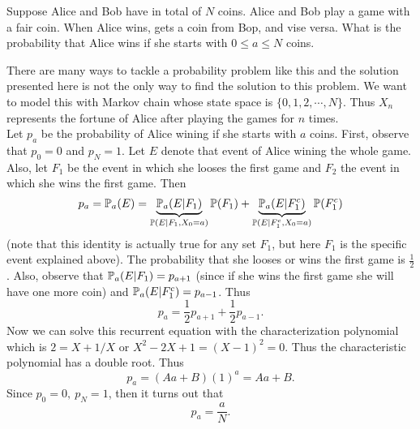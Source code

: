 \begin{example}
	Suppose Alice and Bob have in total of $N$ coins. Alice and Bob play a game with a fair coin. When Alice wins, gets a coin from Bop, and vise versa. What is the probability that Alice wins if she starts with $0\leq a \leq N$ coins.
	
	\begin{solution}
		There are many ways to tackle a probability problem like this and the solution presented here is not the only way to find the solution to this problem. We want to model this with Markov chain whose state space is $\{0,1,2,\cdots,N\}$. Thus $X_n$ represents the fortune of Alice after playing the games for $n$ times. 
		 \\
		Let $p_a$ be the probability of Alice wining if she starts with $a$ coins. First, observe that $p_0 = 0$ and $p_N= 1$. Let $E$ denote that event of Alice wining the whole game. Also, let $F_1$ be the event in which she looses the first game and $F_2$ the event in which she wins the first game. Then
		\[ p_a = \mathbb{P}_a(E) =  \underbrace{\mathbb{P}_a(E | F_1)}_{\mathbb{P}(E|F_1,X_0=a)} \mathbb{P}(F_1) + \underbrace{\mathbb{P}_a(E|F_1^c)}_{\mathbb{P}(E|F_1^c,X_0=a)}\mathbb{P}(F_1^c) \]
		(note that this identity is actually true for any set $F_1$, but here $F_1$ is the specific event explained above). The probability that she looses or wins the first game is $\frac{1}{2}$. Also, observe that $\mathbb{P}_a(E|F_1) = p_{a+1}$ (since if she wins the first game she will have one more coin) and $\mathbb{P}_a(E|F_1^c) = p_{a-1}$. Thus 
		\[ p_a = \frac{1}{2}p_{a+1} + \frac{1}{2}p_{a-1}. \]
		Now we can solve this recurrent equation with the characterization polynomial which is $2 = X + 1/X$ or $X^2 - 2X + 1 = (X-1)^2 = 0$. Thus the characteristic polynomial has a double root. Thus 
		\[ p_a = (Aa + B)(1)^a = Aa + B. \]
		Since $p_0 = 0,\ p_N =1$, then it turns out that
		\[ p_a = \frac{a}{N}. \]
	\end{solution}
\end{example}

